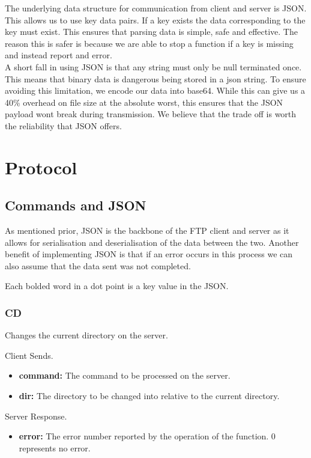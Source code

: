 \documentclass{article}
\begin{document}
The underlying data structure for communication from client and server is JSON. This allows us to use key data pairs. If a key exists the data corresponding to the key must exist. This ensures that parsing data is simple, safe and effective. The reason this is safer is because we are able to stop a function if a key is missing and instead report and error.\\

A short fall in using JSON is that any string must only be null terminated once. This means that binary data is dangerous being stored in a json string. To ensure avoiding this limitation, we encode our data into base64. While this can give us a 40\% overhead on file size at the absolute worst, this ensures that the JSON payload wont break during transmission. We believe that the trade off is worth the reliability that JSON offers.

\section{Protocol}
\subsection{Commands and JSON}
As mentioned prior, JSON is the backbone of the FTP client and server as it allows for serialisation and deserialisation of the data between the two. Another benefit of implementing JSON is that if an error occurs in this process we can also assume that the data sent was not completed.

Each bolded word in a dot point is a key value in the JSON.

\subsubsection{CD}
Changes the current directory on the server.

Client Sends.
\begin{itemize}
\item \textbf{command:} The command to be processed on the server.
\item \textbf{dir:} The directory to be changed into relative to the current directory. 
\end{itemize}

Server Response.
\begin{itemize}
\item \textbf{error:} The error number reported by the operation of the function. 0 represents no error.   
\end{itemize}
\end{document}
